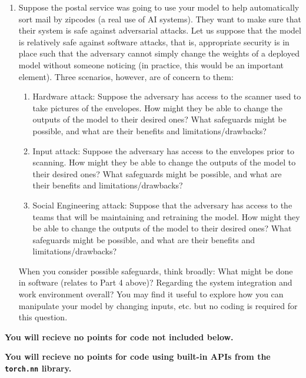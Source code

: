 \documentclass[submit]{harvardml}
\begin{document}
\begin{problem}
\begin{enumerate}
  \item Suppose the postal service was going to use your model to help automatically sort mail by zipcodes (a real use of AI systems).  They want to make sure that their system is safe against adversarial attacks.  Let us suppose that the model is relatively safe against software attacks, that is, appropriate security is in place such that the adversary cannot simply change the weights of a deployed model without someone noticing (in practice, this would be an important element).  Three scenarios, however, are of concern to them:
        \begin{enumerate}
          \item Hardware attack: Suppose the adversary has access to the
                scanner used to take pictures of the envelopes.  How might
                they be able to change the outputs of the model to their
                desired ones?  What safeguards might be possible, and what
                are their benefits and limitations/drawbacks?
          \item Input attack: Suppose the adversary has access to the
                envelopes prior to scanning.  How might they be able to
                change the outputs of the model to their desired ones?
                What safeguards might be possible, and what are their
                benefits and limitations/drawbacks?
          \item Social Engineering attack: Suppose that the adversary
                has access to the teams that will be maintaining and
                retraining the model.  How might they be able to change the
                outputs of the model to their desired ones?  What safeguards
                might be possible, and what are their benefits and
                limitations/drawbacks?
        \end{enumerate}
        When you consider possible safeguards, think broadly: What might
        be done in software (relates to Part 4 above)?  Regarding the
        system integration and work environment overall?  You may find
        it useful to explore how you can manipulate your model by
        changing inputs, etc. but no coding is required for this
        question.

\end{enumerate}

{\bfseries You will recieve no points for code not included below.}

{\bfseries You will recieve no points for code using built-in APIs from the \verb|torch.nn| library.}

\end{problem}
\end{document}
